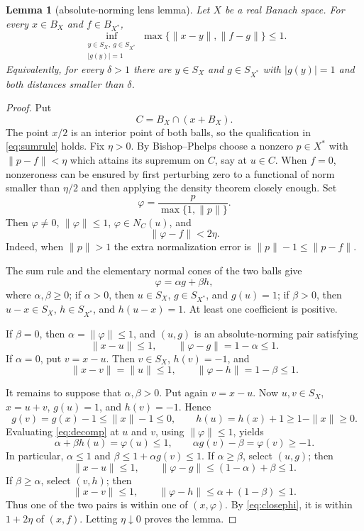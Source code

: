 \documentclass[11pt]{article}
\newtheorem{lemma}{Lemma}
\begin{document}
\begin{lemma}[absolute-norming lens lemma]\label{lem:lens}
Let $X$ be a real Banach space.  For every $x\in B_X$ and $f\in B_{X^*}$,
\[
 \inf_{\substack{y\in S_X,\ g\in S_{X^*}\\ |g(y)|=1}}
 \max\{\|x-y\|,\|f-g\|\}\le1.
\]
Equivalently, for every $\delta>1$ there are $y\in S_X$ and
$g\in S_{X^*}$ with $|g(y)|=1$ and both distances smaller than $\delta$.
\end{lemma}

\begin{proof}
Put
\[
 C=B_X\cap(x+B_X).
\]
The point $x/2$ is an interior point of both balls, so the qualification in
\eqref{eq:sumrule} holds.  Fix $\eta>0$.  By Bishop--Phelps choose a nonzero
$p\in X^*$ with $\|p-f\|<\eta$ which attains its supremum on $C$, say at
$u\in C$.  When $f=0$, nonzeroness can be ensured by first perturbing zero
to a functional of norm smaller than $\eta/2$ and then applying the density
theorem closely enough.  Set
\[
 \varphi=\frac{p}{\max\{1,\|p\|\}}.
\]
Then $\varphi\ne0$, $\|\varphi\|\le1$, $\varphi\in N_C(u)$, and
\begin{equation}\label{eq:closephi}
 \|\varphi-f\|<2\eta.
\end{equation}
Indeed, when $\|p\|>1$ the extra normalization error is
$\|p\|-1\le\|p-f\|$.

The sum rule and the elementary normal cones of the two balls give
\begin{equation}\label{eq:decomp}
 \varphi=\alpha g+\beta h,
\end{equation}
where $\alpha,\beta\ge0$; if $\alpha>0$, then
$u\in S_X$, $g\in S_{X^*}$, and $g(u)=1$; if $\beta>0$, then
$u-x\in S_X$, $h\in S_{X^*}$, and $h(u-x)=1$.  At least one coefficient is
positive.

If $\beta=0$, then $\alpha=\|\varphi\|\le1$, and $(u,g)$ is an
absolute-norming pair satisfying
\[
 \|x-u\|\le1,\qquad \|\varphi-g\|=1-\alpha\le1.
\]
If $\alpha=0$, put $v=x-u$.  Then $v\in S_X$, $h(v)=-1$, and
\[
 \|x-v\|=\|u\|\le1,\qquad \|\varphi-h\|=1-\beta\le1.
\]

It remains to suppose that $\alpha,\beta>0$.  Put again $v=x-u$.
Now $u,v\in S_X$, $x=u+v$, $g(u)=1$, and $h(v)=-1$.  Hence
\[
 g(v)=g(x)-1\le\|x\|-1\le0,
 \qquad
 h(u)=h(x)+1\ge1-\|x\|\ge0.
\]
Evaluating \eqref{eq:decomp} at $u$ and $v$, using
$\|\varphi\|\le1$, yields
\[
 \alpha+\beta h(u)=\varphi(u)\le1,
 \qquad
 \alpha g(v)-\beta=\varphi(v)\ge-1.
\]
In particular, $\alpha\le1$ and $\beta\le1+\alpha g(v)\le1$.  If
$\alpha\ge\beta$, select $(u,g)$; then
\[
 \|x-u\|\le1,
 \qquad
 \|\varphi-g\|
 \le (1-\alpha)+\beta\le1.
\]
If $\beta\ge\alpha$, select $(v,h)$; then
\[
 \|x-v\|\le1,
 \qquad
 \|\varphi-h\|
 \le \alpha+(1-\beta)\le1.
\]
Thus one of the two pairs is within one of $(x,\varphi)$.  By
\eqref{eq:closephi}, it is within $1+2\eta$ of $(x,f)$.  Letting
$\eta\downarrow0$ proves the lemma.
\end{proof}
\end{document}
